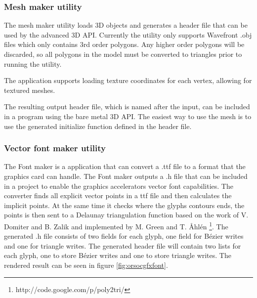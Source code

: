 \documentclass[10pt,a4paper]{article}
\begin{document}
\subsubsection{Mesh maker utility}
\label{sec:meshmaker}
The mesh maker utility loads 3D objects and generates a header file that can be used by the advanced 3D API. Currently the utility only supports Wavefront .obj files which only contains 3rd order polygons. Any higher order polygons will be discarded, so all polygons in the model must be converted to triangles prior to running the utility.

The application supports loading texture coordinates for each vertex, allowing for textured meshes.

The resulting output header file, which is named after the input, can be included in a program using the bare metal 3D API. The easiest way to use the mesh is to use the generated initialize function defined in the header file.

\subsubsection{Vector font maker utility}
\label{sec:fontmaker}
The Font maker is a application that can convert a .ttf file to a format that the graphics card can handle. The Font maker outputs a .h file that can be included in a project to enable the graphics accelerators vector font capabilities. The converter finds all explicit vector points in a ttf file and then calculates the implicit points. At the same time it checks where the glyphs contours ends, the points is then sent to a Delaunay triangulation function based on the work of V. Domiter and B. Zalik and implemented by M. Green and T. \AA hl\'{e}n \footnote{http://code.google.com/p/poly2tri/}. The generated .h file consists of two fields for each glyph, one field for B\'{e}zier writes and one for triangle writes. The generated header file will contain two lists for each glyph, one to store B\'{e}zier writes and one to store triangle writes. The rendered result can be seen in figure \ref{fig:orsocgfxfont}.
\end{document}
